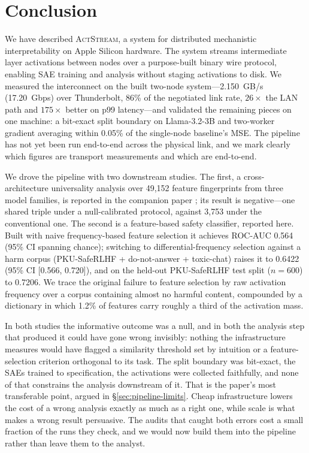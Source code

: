 \documentclass[11pt]{article}
\newcommand{\actstream}{\textsc{ActStream}}
\begin{document}
\section{Conclusion}
\label{sec:conclusion}

We have described \actstream{}, a system for distributed mechanistic interpretability on Apple Silicon hardware. The system streams intermediate layer activations between nodes over a purpose-built binary wire protocol, enabling SAE training and analysis without staging activations to disk. We measured the interconnect on the built two-node system---2.150~GB/s (17.20~Gbps) over Thunderbolt, 86\% of the negotiated link rate, $26\times$ the LAN path and $175\times$ better on p99 latency---and validated the remaining pieces on one machine: a bit-exact split boundary on Llama-3.2-3B and two-worker gradient averaging within 0.05\% of the single-node baseline's MSE. The pipeline has not yet been run end-to-end across the physical link, and we mark clearly which figures are transport measurements and which are end-to-end.

We drove the pipeline with two downstream studies. The first, a cross-architecture universality analysis over 49,152 feature fingerprints from three model families, is reported in the companion paper \citep{melton2026saecomparison}; its result is negative---one shared triple under a null-calibrated protocol, against 3,753 under the conventional one. The second is a feature-based safety classifier, reported here. Built with naive frequency-based feature selection it achieves ROC-AUC 0.564 (95\% CI spanning chance); switching to differential-frequency selection against a harm corpus (PKU-SafeRLHF + do-not-answer + toxic-chat) raises it to 0.6422 (95\% CI [0.566, 0.720]), and on the held-out PKU-SafeRLHF test split ($n = 600$) to 0.7206. We trace the original failure to feature selection by raw activation frequency over a corpus containing almost no harmful content, compounded by a dictionary in which 1.2\% of features carry roughly a third of the activation mass.

In both studies the informative outcome was a null, and in both the analysis step that produced it could have gone wrong invisibly: nothing the infrastructure measures would have flagged a similarity threshold set by intuition or a feature-selection criterion orthogonal to its task. The split boundary was bit-exact, the SAEs trained to specification, the activations were collected faithfully, and none of that constrains the analysis downstream of it. That is the paper's most transferable point, argued in \S\ref{sec:pipeline-limits}. Cheap infrastructure lowers the cost of a wrong analysis exactly as much as a right one, while scale is what makes a wrong result persuasive. The audits that caught both errors cost a small fraction of the runs they check, and we would now build them into the pipeline rather than leave them to the analyst.
\end{document}
